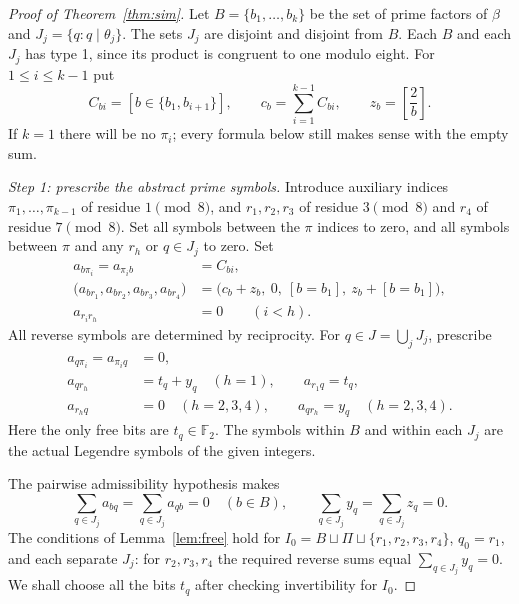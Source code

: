 \documentclass[11pt,a4paper]{article}
\theoremstyle{definition}
\newcommand{\FF}{\mathbb F_2}
\newcommand{\sgnbit}[2]{\left[\frac{#1}{#2}\right]}
\begin{document}
\begin{proof}[Proof of Theorem~\ref{thm:sim}]
Let $B=\{b_1,\dots,b_k\}$ be the set of prime factors
of $\beta$ and $J_j=\{q:q\mid\theta_j\}$.
The sets $J_j$ are disjoint and disjoint from $B$.
Each $B$ and each $J_j$ has type 1, since its product
is congruent to one modulo eight.
For $1\le i\le k-1$ put
\[
 C_{b i}=[b\in\{b_1,b_{i+1}\}],\qquad
 c_b=\sum_{i=1}^{k-1}C_{bi},\qquad
 z_b=\sgnbit{2}{b}.
\]
If $k=1$ there will be no $\pi_i$; every formula below
still makes sense with the empty sum.

\emph{Step 1: prescribe the abstract prime symbols.}
Introduce auxiliary indices $\pi_1,\ldots,\pi_{k-1}$
of residue $1\pmod8$, and $r_1,r_2,r_3$ of residue
$3\pmod8$ and $r_4$ of residue $7\pmod8$.
Set all symbols between the $\pi$ indices to zero,
and all symbols between $\pi$ and any $r_h$ or $q\in J_j$
to zero.  Set
\begin{align}
  a_{b\pi_i}=a_{\pi_i b}&=C_{bi},\label{eq:pi_bits}\\
  \bigl(a_{b r_1},a_{b r_2},a_{b r_3},a_{b r_4}\bigr)
   &=\bigl(c_b+z_b,\ 0,\ [b=b_1],\ z_b+[b=b_1]\bigr),
                                                   \label{eq:r_bits}\\
  a_{r_i r_h}&=0\qquad(i<h).\label{eq:rr_bits}
\end{align}
All reverse symbols are determined by reciprocity.
For $q\in J=\bigcup_j J_j$, prescribe
\begin{align}
 a_{q\pi_i}=a_{\pi_iq}&=0,\\
 a_{q r_h}&=t_q+y_q\quad(h=1),\qquad
                   a_{r_1q}=t_q,\label{eq:t_bits}\\
 a_{r_hq}&=0\quad(h=2,3,4),
          \qquad a_{q r_h}=y_q\quad(h=2,3,4).
\end{align}
Here the only free bits are $t_q\in\FF$.
The symbols within $B$ and within each $J_j$ are the
actual Legendre symbols of the given integers.

The pairwise admissibility hypothesis makes
\[
 \sum_{q\in J_j}a_{bq}=
 \sum_{q\in J_j}a_{qb}=0\quad(b\in B),
 \qquad \sum_{q\in J_j}y_q=
       \sum_{q\in J_j}z_q=0.
\]
The conditions of Lemma~\ref{lem:free} hold for
$I_0=B\sqcup\Pi\sqcup\{r_1,r_2,r_3,r_4\}$,
$q_0=r_1$, and each separate $J_j$: for $r_2,r_3,r_4$
the required reverse sums equal $\sum_{q\in J_j}y_q=0$.
We shall choose all the bits $t_q$ after checking
invertibility for $I_0$.


\end{proof}
\end{document}
